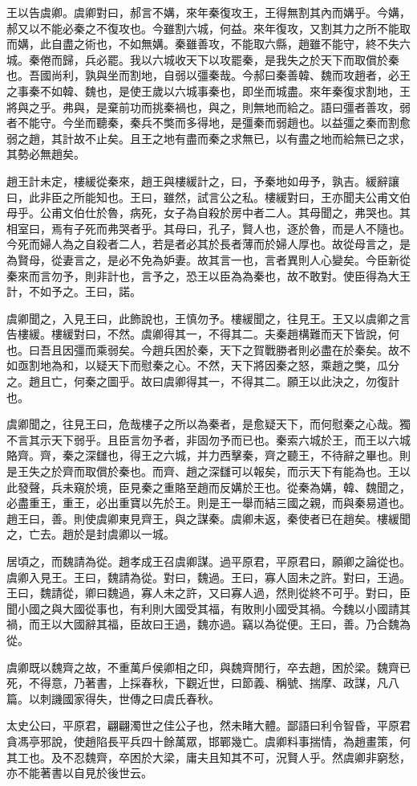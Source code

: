王以告虞卿。虞卿對曰，郝言不媾，來年秦復攻王，王得無割其內而媾乎。今媾，郝又以不能必秦之不復攻也。今雖割六城，何益。來年復攻，又割其力之所不能取而媾，此自盡之術也，不如無媾。秦雖善攻，不能取六縣，趙雖不能守，終不失六城。秦倦而歸，兵必罷。我以六城收天下以攻罷秦，是我失之於天下而取償於秦也。吾國尚利，孰與坐而割地，自弱以彊秦哉。今郝曰秦善韓、魏而攻趙者，必王之事秦不如韓、魏也，是使王歲以六城事秦也，即坐而城盡。來年秦復求割地，王將與之乎。弗與，是棄前功而挑秦禍也，與之，則無地而給之。語曰彊者善攻，弱者不能守。今坐而聽秦，秦兵不獘而多得地，是彊秦而弱趙也。以益彊之秦而割愈弱之趙，其計故不止矣。且王之地有盡而秦之求無已，以有盡之地而給無已之求，其勢必無趙矣。

趙王計未定，樓緩從秦來，趙王與樓緩計之，曰，予秦地如毋予，孰吉。緩辭讓曰，此非臣之所能知也。王曰，雖然，試言公之私。樓緩對曰，王亦聞夫公甫文伯母乎。公甫文伯仕於魯，病死，女子為自殺於房中者二人。其母聞之，弗哭也。其相室曰，焉有子死而弗哭者乎。其母曰，孔子，賢人也，逐於魯，而是人不隨也。今死而婦人為之自殺者二人，若是者必其於長者薄而於婦人厚也。故從母言之，是為賢母，從妻言之，是必不免為妒妻。故其言一也，言者異則人心變矣。今臣新從秦來而言勿予，則非計也，言予之，恐王以臣為為秦也，故不敢對。使臣得為大王計，不如予之。王曰，諾。

虞卿聞之，入見王曰，此飾說也，王慎勿予。樓緩聞之，往見王。王又以虞卿之言告樓緩。樓緩對曰，不然。虞卿得其一，不得其二。夫秦趙構難而天下皆說，何也。曰吾且因彊而乘弱矣。今趙兵困於秦，天下之賀戰勝者則必盡在於秦矣。故不如亟割地為和，以疑天下而慰秦之心。不然，天下將因秦之怒，乘趙之獘，瓜分之。趙且亡，何秦之圖乎。故曰虞卿得其一，不得其二。願王以此決之，勿復計也。

虞卿聞之，往見王曰，危哉樓子之所以為秦者，是愈疑天下，而何慰秦之心哉。獨不言其示天下弱乎。且臣言勿予者，非固勿予而已也。秦索六城於王，而王以六城賂齊。齊，秦之深讎也，得王之六城，并力西擊秦，齊之聽王，不待辭之畢也。則是王失之於齊而取償於秦也。而齊、趙之深讎可以報矣，而示天下有能為也。王以此發聲，兵未窺於境，臣見秦之重賂至趙而反媾於王也。從秦為媾，韓、魏聞之，必盡重王，重王，必出重寶以先於王。則是王一舉而結三國之親，而與秦易道也。趙王曰，善。則使虞卿東見齊王，與之謀秦。虞卿未返，秦使者已在趙矣。樓緩聞之，亡去。趙於是封虞卿以一城。

居頃之，而魏請為從。趙孝成王召虞卿謀。過平原君，平原君曰，願卿之論從也。虞卿入見王。王曰，魏請為從。對曰，魏過。王曰，寡人固未之許。對曰，王過。王曰，魏請從，卿曰魏過，寡人未之許，又曰寡人過，然則從終不可乎。對曰，臣聞小國之與大國從事也，有利則大國受其福，有敗則小國受其禍。今魏以小國請其禍，而王以大國辭其福，臣故曰王過，魏亦過。竊以為從便。王曰，善。乃合魏為從。

虞卿既以魏齊之故，不重萬戶侯卿相之印，與魏齊閒行，卒去趙，困於梁。魏齊已死，不得意，乃著書，上採春秋，下觀近世，曰節義、稱號、揣摩、政謀，凡八篇。以刺譏國家得失，世傳之曰虞氏春秋。

太史公曰，平原君，翩翩濁世之佳公子也，然未睹大體。鄙語曰利令智昏，平原君貪馮亭邪說，使趙陷長平兵四十餘萬眾，邯鄲幾亡。虞卿料事揣情，為趙畫策，何其工也。及不忍魏齊，卒困於大梁，庸夫且知其不可，況賢人乎。然虞卿非窮愁，亦不能著書以自見於後世云。